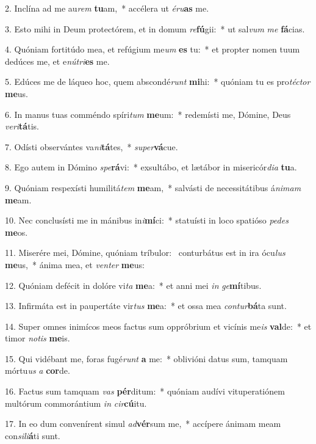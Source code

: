 2. Inclína ad me au\textit{rem} \textbf{tu}am,~*  accélera ut \textit{é}\textit{ru}\textbf{as} me.\

3. Esto mihi in Deum protectórem, et in domum \textit{re}\textbf{fú}gii:~*  ut sal\textit{vum} \textit{me} \textbf{fá}cias.\

4. Quóniam fortitúdo mea, et refúgium me\textit{um} \textbf{es} tu:~*  et propter nomen tuum dedúces me, et e\textit{nú}\textit{tri}\textbf{es} me.\

5. Edúces me de láqueo hoc, quem abscondé\textit{runt} \textbf{mi}hi:~*  quóniam tu es pro\textit{téc}\textit{tor} \textbf{me}us.\

6. In manus tuas comméndo spíri\textit{tum} \textbf{me}um:~*  redemísti me, Dómine, Deus \textit{ve}\textit{ri}\textbf{tá}tis.\

7. Odísti observántes va\textit{ni}\textbf{tá}tes,~*  \textit{su}\textit{per}\textbf{vá}cue.\

8. Ego autem in Dómino \textit{spe}\textbf{rá}vi:~*  exsultábo, et lætábor in misericór\textit{di}\textit{a} \textbf{tu}a.\

9. Quóniam respexísti humilitá\textit{tem} \textbf{me}am,~*  salvásti de necessitátibus á\textit{ni}\textit{mam} \textbf{me}am.\

10. Nec conclusísti me in mánibus in\textit{i}\textbf{mí}ci:~*  statuísti in loco spatióso \textit{pe}\textit{des} \textbf{me}os.\

11. Miserére mei, Dómine, quóniam tríbulor: \dag\  conturbátus est in ira ócu\textit{lus} \textbf{me}us,~*  ánima mea, et \textit{ven}\textit{ter} \textbf{me}us:\

12. Quóniam defécit in dolóre vi\textit{ta} \textbf{me}a:~*  et anni mei \textit{in} \textit{ge}\textbf{mí}tibus.\

13. Infirmáta est in paupertáte vir\textit{tus} \textbf{me}a:~*  et ossa mea \textit{con}\textit{tur}\textbf{bá}ta sunt.\

14. Super omnes inimícos meos factus sum oppróbrium et vicínis me\textit{is} \textbf{val}de:~*  et timor \textit{no}\textit{tis} \textbf{me}is.\

15. Qui vidébant me, foras fugé\textit{runt} \textbf{a} me:~*  oblivióni datus sum, tamquam mórtu\textit{us} \textit{a} \textbf{cor}de.\

16. Factus sum tamquam \textit{vas} \textbf{pér}ditum:~*  quóniam audívi vituperatiónem multórum commorántium \textit{in} \textit{cir}\textbf{cú}itu.\

17. In eo dum convenírent simul \textit{ad}\textbf{vér}sum me,~*  accípere ánimam meam con\textit{si}\textit{li}\textbf{á}ti sunt.\

